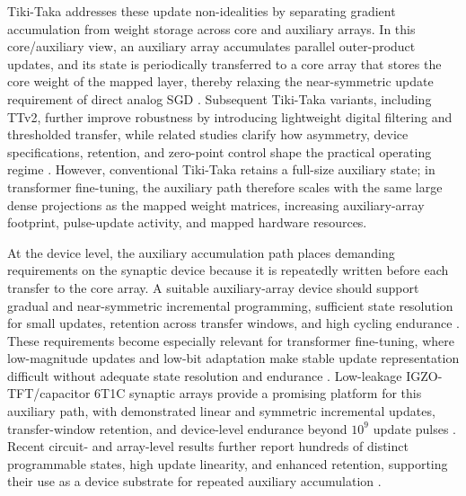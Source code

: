 \documentclass[AMA,LATO2COL]{WileyNJDv5}
\begin{document}
\noindent
Tiki-Taka addresses these update non-idealities by separating gradient accumulation from weight storage across core and auxiliary arrays.
In this core/auxiliary view, an auxiliary array accumulates parallel outer-product updates, and its state is periodically transferred to a core array that stores the core weight of the mapped layer, thereby relaxing the near-symmetric update requirement of direct analog SGD \cite{gokmen2020tikitaka,onen2022asymmetric}.
Subsequent Tiki-Taka variants, including TTv2, further improve robustness by introducing lightweight digital filtering and thresholded transfer, while related studies clarify how asymmetry, device specifications, retention, and zero-point control shape the practical operating regime \cite{gokmen2021ttv2,lee2022tikitaka_asymmetry,byun2024devicespec_tikitaka,stecconi2024nanolett_tikitaka,noh2024retention_zeroshifting,rasch2024fastrobust}.
However, conventional Tiki-Taka retains a full-size auxiliary state; in transformer fine-tuning, the auxiliary path therefore scales with the same large dense projections as the mapped weight matrices, increasing auxiliary-array footprint, pulse-update activity, and mapped hardware resources.

\noindent
At the device level, the auxiliary accumulation path places demanding requirements on the synaptic device because it is repeatedly written before each transfer to the core array.
A suitable auxiliary-array device should support gradual and near-symmetric incremental programming, sufficient state resolution for small updates, retention across transfer windows, and high cycling endurance \cite{gokmen2021ttv2,rasch2024fastrobust,won2023advs_6t1c}.
These requirements become especially relevant for transformer fine-tuning, where low-magnitude updates and low-bit adaptation make stable update representation difficult without adequate state resolution and endurance \cite{jeon2025l4q,zhou2025quzo,chen2025albertanalog}.
Low-leakage IGZO-TFT/capacitor 6T1C synaptic arrays provide a promising platform for this auxiliary path, with demonstrated linear and symmetric incremental updates, transfer-window retention, and device-level endurance beyond \(10^9\) update pulses \cite{won2023advs_6t1c}.
Recent circuit- and array-level results further report hundreds of distinct programmable states, high update linearity, and enhanced retention, supporting their use as a device substrate for repeated auxiliary accumulation \cite{kang2025jssc_6t1c,kang2025advs_disturbance,han2025acsami_gi}.
\end{document}
